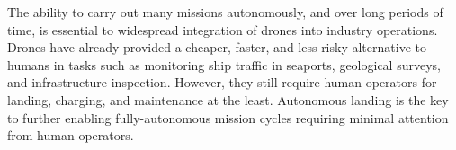 
The ability to carry out many missions autonomously, and over long periods of time,
is essential to widespread integration of drones into industry operations.
Drones have already provided a cheaper, faster, and less risky alternative to humans in tasks such as
monitoring ship traffic in seaports\cite{security_integration},
geological surveys\cite{eit},
and infrastructure inspection.\cite{maritine_infrastructure_inspection}
However, they still require human operators for landing, charging, and maintenance at the least.
Autonomous landing is the key to further enabling fully-autonomous mission cycles requiring minimal attention from human operators.